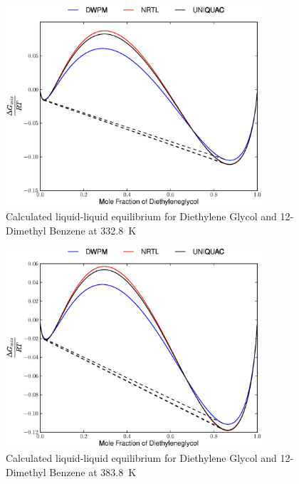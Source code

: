 \begin{figure}[hp]
\centering
\includegraphics[width = 0.85\textwidth]{Results_Parts/BinaryParams/diethyleneglycol-12-dimethylbenzene/AllModelsGibbsPlots/T_332.8.eps}
\caption{Calculated liquid-liquid equilibrium for Diethylene Glycol and 12-Dimethyl Benzene at 332.8~$\mathrm{K}$} 
\end{figure}

\begin{figure}[hp]
\centering
\includegraphics[width = 0.85\textwidth]{Results_Parts/BinaryParams/diethyleneglycol-12-dimethylbenzene/AllModelsGibbsPlots/T_353.8.eps}
\caption{Calculated liquid-liquid equilibrium for Diethylene Glycol and 12-Dimethyl Benzene at 383.8~$\mathrm{K}$} 
\end{figure}


